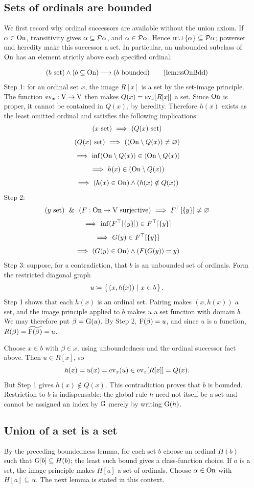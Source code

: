 \subsection{Sets of ordinals are bounded}
We first record why ordinal successors are available without the union
axiom. If $\alpha\in\mathrm{On}$, transitivity gives $\alpha\subseteq\mathcal{P}\alpha$,
and $\alpha\in\mathcal{P}\alpha$. Hence
$\alpha\cup\{\alpha\}\subseteq\mathcal{P}\alpha$; powerset and heredity make
this successor a set. In particular, an unbounded subclass of $\mathrm{On}$ has
an element strictly above each specified ordinal.
\begin{lemma}
\[
(b\set)\land(b\subclass\On)\implies(b\text{ bounded})
\labeltagd{lem}{ssOnBdd}
\]
\Proof
Step 1: for an ordinal set $x$, the image $R[x]$ is a set by the
set-image principle. The function $\mathrm{ev}_x:\mathrm{V}\to\mathrm{V}$ then makes
$Q(x)=\mathrm{ev}_x[R[x]]$ a set. Since $\mathrm{On}$ is proper, it cannot be contained
in $Q(x)$, by heredity. Therefore $h(x)$ exists as the least omitted
ordinal and satisfies the following implications:
\[
(x\mathrm{\ set})
\ \Longrightarrow\ 
(Q(x)\mathrm{\ set})
\]
\[
(Q(x)\mathrm{\ set})
\ \Longrightarrow\ 
((\mathrm{On}\setminus Q(x))\neq\varnothing)
\]
\[
\ \Longrightarrow\ 
\inf(\mathrm{On}\setminus Q(x)) \in (\mathrm{On}\setminus Q(x))
\]
\[
\ \Longrightarrow\ 
h(x)\in (\mathrm{On}\setminus Q(x))
\]
\[
\ \Longrightarrow\ 
(h(x)\in \mathrm{On})
\land
(h(x)\notin Q(x))
\]
Step 2:
\[
(y\mathrm{\ set})
\ \ \&\ \ 
(F:\mathrm{On}\to\mathrm{V}\text{ surjective})
\ \Longrightarrow\ 
F^\top[\{y\}]\neq\varnothing
\]
\[
\ \Longrightarrow\ 
\inf(F^\top[\{y\}])\in F^\top[\{y\}]
\]
\[
\ \Longrightarrow\ 
G(y)\in F^\top[\{y\}]
\]
\[
\ \Longrightarrow\ 
(G(y)\in\mathrm{On})\land( F(G(y))=y)
\]
Step 3: suppose, for a contradiction, that $b$ is an unbounded set of
ordinals. Form the restricted diagonal graph
\[
u\,{\coloneqq}\,\left\{\,(x,h(x))\ \middle|\ x\in b\,\right\}.
\]
Step 1 shows that each $h(x)$ is an ordinal set. Pairing makes
$(x,h(x))$ a set, and the image principle applied to $b$ makes $u$ a set
function with domain $b$. We may therefore put $\beta=\mathrm{G}(u)$.
By Step 2, $\mathrm{F}(\beta)=u$, and since $u$ is a function,
$R(\beta)=\widetilde{\mathrm{F}(\beta)}=u$.

Choose $x\in b$ with $\beta\in x$, using unboundedness and the ordinal
successor fact above. Then $u\in R[x]$, so
\[
h(x)=u(x)=\mathrm{ev}_x(u)\in\mathrm{ev}_x[R[x]]=Q(x).
\]
But Step 1 gives $h(x)\notin Q(x)$. This contradiction proves that $b$
is bounded. Restriction to $b$ is indispensable: the global rule $h$ need
not itself be a set and cannot be assigned an index by $\mathrm{G}$ merely by
writing $\mathrm{G}(h)$.
\Done
\end{lemma}

\subsection{Union of a set is a set}
By the preceding boundedness lemma, for each set $b$ choose an ordinal
$H(b)$ such that $\mathrm{G}[b]\subseteq H(b)$; the least such bound gives a
class-function choice. If $a$ is a set, the image principle makes $H[a]$
a set of ordinals. Choose $\alpha\in\mathrm{On}$ with $H[a]\subseteq\alpha$.
The next lemma is stated in this context.

